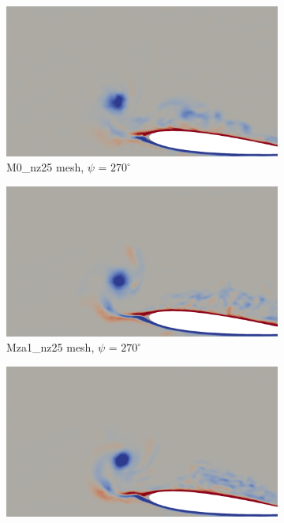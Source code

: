 \begin{figure}[H]
	\centering
	\begin{center}
		\begin{subfigure}[b]{0.475\textwidth}
		\centering
		\includegraphics[width=1\textwidth]{figures/zonal_adapt_results/vorticity_plots/v3/M0/spavg/phase_270.png}
		\caption{M0\_nz25 mesh, $\psi$ = $270^\circ$}
		\label{fig:M0_sp_psi270}
		\end{subfigure}
	\end{center}
	\begin{subfigure}[b]{0.475\textwidth}
	\centering
	\includegraphics[width=1\textwidth]{figures/zonal_adapt_results/vorticity_plots/v3/Mza1_25/spavg/phase_270.png}
	\caption{Mza1\_nz25 mesh, $\psi$ = $270^\circ$}
	\label{fig:Mza1_25_sp_psi270}
	\end{subfigure}
	\begin{subfigure}[b]{0.475\textwidth}
		\centering
		\includegraphics[width=1\textwidth]{figures/zonal_adapt_results/vorticity_plots/v3/Mza1_50/spavg/phase_270.png}

\end{subfigure}
\end{figure}
